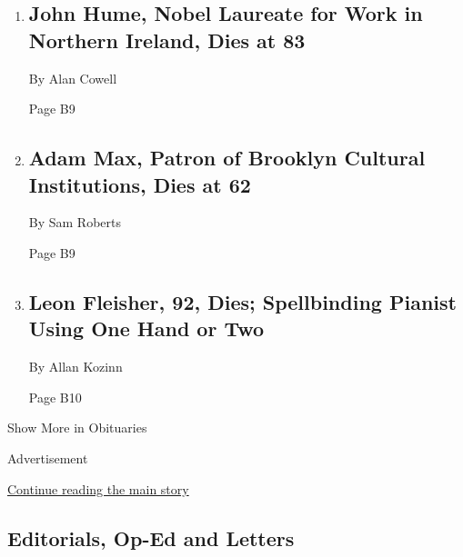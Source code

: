 \begin{enumerate}
\def\labelenumi{\arabic{enumi}.}
\item
  \href{/2020/08/03/obituaries/john-hume-dies.html}{}

  \hypertarget{john-hume-nobel-laureate-for-work-in-northern-ireland-dies-at-83-1}{%
  \subsection{John Hume, Nobel Laureate for Work in Northern Ireland,
  Dies at
  83}\label{john-hume-nobel-laureate-for-work-in-northern-ireland-dies-at-83-1}}

  By Alan Cowell

  Page B9
\item
  \href{/2020/08/03/arts/adam-max-patron-of-brooklyn-cultural-institutions-dies-at-62.html}{}

  \hypertarget{adam-max-patron-of-brooklyn-cultural-institutions-dies-at-62}{%
  \subsection{Adam Max, Patron of Brooklyn Cultural Institutions, Dies
  at
  62}\label{adam-max-patron-of-brooklyn-cultural-institutions-dies-at-62}}

  By Sam Roberts

  Page B9
\item
  \href{/2020/08/02/arts/music/leon-fleisher-dead.html}{}

  \hypertarget{leon-fleisher-92-dies-spellbinding-pianist-using-one-hand-or-two}{%
  \subsection{Leon Fleisher, 92, Dies; Spellbinding Pianist Using One
  Hand or
  Two}\label{leon-fleisher-92-dies-spellbinding-pianist-using-one-hand-or-two}}

  By Allan Kozinn

  Page B10
\end{enumerate}

Show More in Obituaries

Advertisement

\protect\hyperlink{after-mid3}{Continue reading the main story}

\hypertarget{editorials-op-ed-and-letters}{%
\subsection{Editorials, Op-Ed and
Letters}\label{editorials-op-ed-and-letters}}

